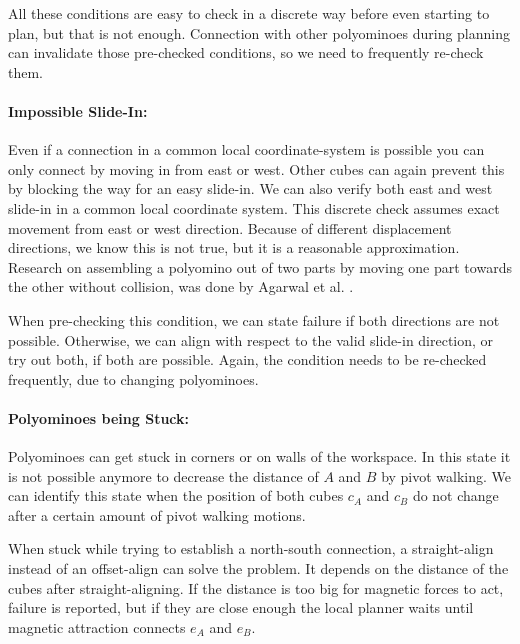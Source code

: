 All these conditions are easy to check in a discrete way before even starting to plan, but that is not enough.
Connection with other polyominoes during planning can invalidate those pre-checked conditions, so we need to frequently re-check them.

\paragraph{Impossible Slide-In:}

Even if a connection in a common local coordinate-system is possible you can only connect by moving in from east or west.
Other cubes can again prevent this by blocking the way for an easy slide-in.
We can also verify both east and west slide-in in a common local coordinate system.
This discrete check assumes exact movement from east or west direction.
Because of different displacement directions, we know this is not true, but it is a reasonable approximation.
Research on assembling a polyomino out of two parts by moving one part towards the other without collision, was done by Agarwal et al. \cite{agarwal2021}. 

When pre-checking this condition, we can state failure if both directions are not possible.
Otherwise, we can align with respect to the valid slide-in direction, or try out both, if both are possible.
Again, the condition needs to be re-checked frequently, due to changing polyominoes.

\paragraph{Polyominoes being Stuck:}

Polyominoes can get stuck in corners or on walls of the workspace.
In this state it is not possible anymore to decrease the distance of $A$ and $B$ by pivot walking.
We can identify this state when the position of both cubes $c_A$ and $c_B$ do not change after a certain amount of pivot walking motions.

When stuck while trying to establish a north-south connection, a straight-align instead of an offset-align can solve the problem.
It depends on the distance of the cubes after straight-aligning.
If the distance is too big for magnetic forces to act, failure is reported, but if they are close enough the local planner waits until magnetic attraction connects $e_A$ and $e_B$.


